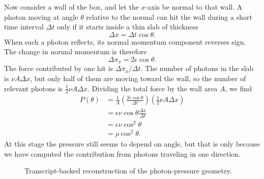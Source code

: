 Now consider a wall of the box, and let the \(x\)-axis be normal to that wall. A photon moving at angle \(\theta\) relative to the normal can hit the wall during a short time interval \(\Delta t\) only if it starts inside a thin slab of thickness
\begin{equation}
\Delta x=\Delta t\cos\theta.
\end{equation}
When such a photon reflects, its normal momentum component reverses sign. The change in normal momentum is therefore
\begin{equation}
\Delta \pi_x = 2\epsilon \cos\theta.
\end{equation}
The force contributed by one hit is \(\Delta \pi_x/\Delta t\). The number of photons in the slab is \(\nu A \Delta x\), but only half of them are moving toward the wall, so the number of relevant photons is \(\tfrac12 \nu A \Delta x\). Dividing the total force by the wall area \(A\), we find
\begin{align}
P(\theta)
&=
\frac{1}{A}
\left(\frac{2\epsilon\cos\theta}{\Delta t}\right)
\left(\frac12 \nu A \Delta x\right) \\
&=
\epsilon \nu \cos\theta \frac{\Delta x}{\Delta t} \\
&=
\epsilon \nu \cos^2\theta \\
&=
\rho \cos^2\theta.
\end{align}
At this stage the pressure still seems to depend on angle, but that is only because we have computed the contribution from photons traveling in one direction.

\begin{figure}[h]
\centering
{}
\caption{Transcript-backed reconstruction of the photon-pressure geometry.}
\end{figure}

